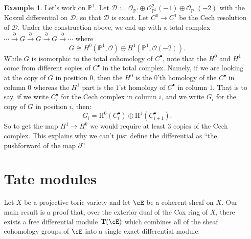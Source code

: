\documentclass[12pt]{amsart}
\theoremstyle{definition}
\newtheorem{example}[lemma]{Example}
\theoremstyle{remark}
\newcommand{\Tate}{{\mathbf{T}}}
\newcommand{\PP}{\mathbb P}
\newcommand{\HH}{\mathrm H}
\newcommand{\Pic}{\operatorname{Pic}}
\newcommand{\cO}{{\mathcal O}}
\newcommand{\daniel}[1]{{\color{blue} \sf $\clubsuit\clubsuit\clubsuit$ Daniel: [#1]}}
\begin{document}
\begin{example}
Let's work on $\PP^1$.  Let $\mathcal D:= \cO_{\PP^1}\oplus \cO_{\PP^1}^2(-1) \oplus \cO_{\PP^1}(-2)$ with the Koszul differential on $\mathcal D$, so that $\mathcal D$ is exact.  Let $C^0\to C^1$ be the Cech resolution of $\mathcal D$. Under the construction above, we end up with a total complex
$
\cdots \overset{\partial}{\longrightarrow} G \overset{\partial}{\longrightarrow} G \overset{\partial}{\longrightarrow}G \overset{\partial}{\longrightarrow} \cdots
$
where
\[
G\cong H^0(\PP^1,\cO) \oplus H^1(\PP^1,\cO(-2)).
\]
While $G$ is isomorphic to the total cohomology of $C^\bullet$, note that the $H^0$ and $H^1$ come from different copies of $C^\bullet$ in the total complex.  Namely, if we are looking at the copy of $G$ in position $0$, then the $H^0$ is the $0$'th homology of the $C^\bullet$ in column $0$ whereas the $H^1$ part is the $1$'st homology of $C^\bullet$ in column $1$.  That is to say, if we write $C^\bullet_i$ for the Cech complex in column $i$, and we write $G_i$ for the copy of $G$ in position $i$, then:
\[
G_i = \HH^0(C^\bullet_i)\oplus  \HH^1(C^\bullet_{i+1}).
\]
So to get the map $H^1\to H^0$ we would require at least $3$ copies of the Cech complex.  This explains why we can't just define the differential as ``the pushforward of the map $\partial$''.
\end{example}





\section{Tate modules}
Let $X$ be a projective toric variety and let $\cE$ be a coherent sheaf on $X$.  Our main result is a proof that, over the exterior dual of the Cox ring of $X$, there exists a free differential module $\Tate(\cE)$ which combines all of the sheaf cohomology groups of $\cE$ into a single exact differential module.  

\end{document}
